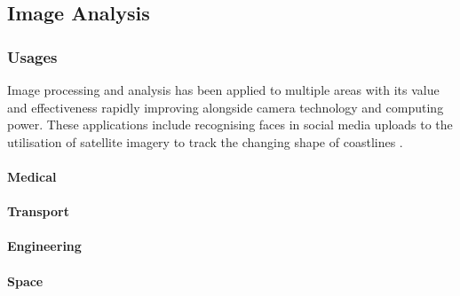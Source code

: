 \subsection{Image Analysis}
	\subsubsection{Usages}
	Image processing and analysis has been applied to multiple areas with its value and effectiveness rapidly improving alongside camera technology and computing power. These applications include recognising faces in social media uploads \citep{zuckerberg2011tagging} to the utilisation of satellite imagery to track the changing shape of coastlines \citep{costalimagery}.
	\paragraph{Medical}
	\paragraph{Transport}
	\paragraph{Engineering}
	\paragraph{Space}